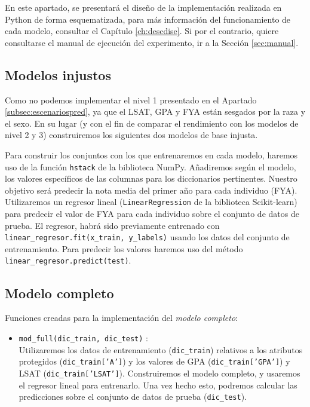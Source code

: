 \documentclass[oneside,openright,titlepage,numbers=noenddot,openany,headinclude,footinclude=true,
cleardoublepage=empty,abstractoff,BCOR=5mm,paper=a4,fontsize=12pt,main=spanish]{scrreprt}
\begin{document}
En este apartado, se presentará el diseño de la implementación realizada en Python de forma esquematizada, para más información del funcionamiento de cada modelo, consultar el Capítulo \ref{ch:descdise}. Si por el contrario, quiere consultarse el manual de ejecución del experimento, ir a la Sección \ref{sec:manual}.

\subsection{Modelos injustos}

Como no podemos implementar el nivel 1 presentado en el Apartado \ref{subsec:escenariospred}, ya que el LSAT, GPA y FYA están sesgados por la raza y el sexo. En su lugar (y con el fin de comparar el rendimiento con los modelos de nivel 2 y 3) construiremos los siguientes dos modelos de base injusta.

Para construir los conjuntos con los que entrenaremos en cada modelo, haremos uso de la función \texttt{hstack} de la biblioteca NumPy. Añadiremos según el modelo, los valores específicos de las columnas para los diccionarios pertinentes. Nuestro objetivo será predecir la nota media del primer año para cada individuo (FYA). Utilizaremos un regresor lineal (\texttt{LinearRegression} de la biblioteca Scikit-learn) para predecir el valor de FYA para cada individuo sobre el conjunto de datos de prueba. El regresor, habrá sido previamente entrenado con \texttt{linear\_regresor.fit(x\_train, y\_labels)} usando los datos del conjunto de entrenamiento. Para predecir los valores haremos uso del método \texttt{linear\_regresor.predict(test)}.

\subsection*{Modelo completo}

Funciones creadas para la implementación del \textit{modelo completo}:

\begin{itemize}
    \item \texttt{mod\_full(dic\_train, dic\_test)} :\\ 
    Utilizaremos los datos de entrenamiento (\texttt{dic\_train}) relativos a los atributos protegidos (\texttt{dic\_train['A']}) y los valores de GPA (\texttt{dic\_train['GPA']}) y LSAT (\texttt{dic\_train['LSAT']}). Construiremos el modelo completo, y usaremos el regresor lineal para entrenarlo. Una vez hecho esto, podremos calcular las predicciones sobre el conjunto de datos de prueba (\texttt{dic\_test}).
\end{itemize}
\end{document}

